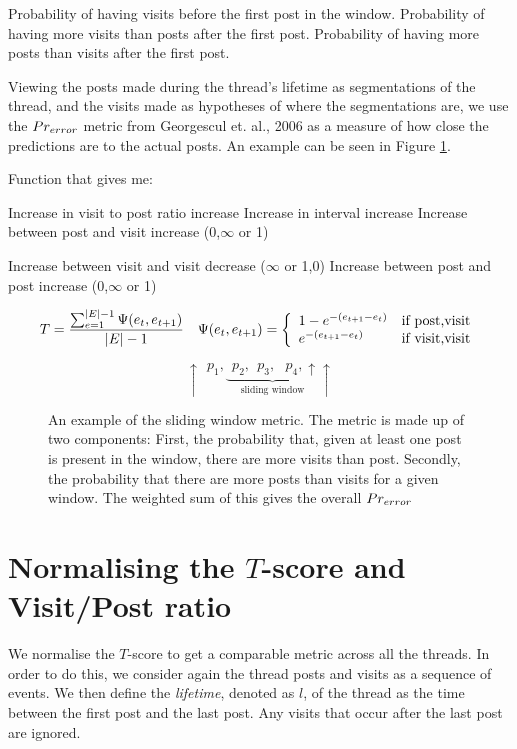 Probability of having visits before the first post in the window.
Probability of having more visits than posts after the first post.
Probability of having more posts than visits after the first post.



Viewing the posts made during the thread's lifetime as segmentations of the 
thread, and the visits made as hypotheses of where the segmentations are, we use 
the $Pr_{error}$ metric from Georgescul et. al., 2006 as a measure of how close 
the predictions are to the actual posts. An example can be seen in Figure 
\ref{prerror}.



Function that gives me:

Increase in visit to post ratio		increase
Increase in interval				increase
Increase between post and visit		increase
(0,$\infty$ or 1)

Increase between visit and visit	decrease
($\infty$ or 1,0)
Increase between post and post		increase
(0,$\infty$ or 1)

\[
	\begin{array}{l l}
	T = \dfrac{%
		\sum_{e=1}^{|E|-1} \Psi(e_t,e_{t+1}) %
	}{|E|-1} &
		\Psi(e_t,e_{t+1}) = \left\{\begin{array}{l l}
				1-e^{-(e_{t+1} - e_t)}	& \text{if post,visit}\\
				e^{-(e_{t+1} - e_t)}			& \text{if visit,visit}\\
		\end{array}\right.
\end{array}
\]

\begin{figure}
\[
	\uparrow~~p_1,\underbrace{~~p_2,~~p_3,~~~p_4,\uparrow}_{\text{sliding window}}\uparrow
\]
\caption{An example of the sliding window metric. The metric is made up of two components: First, the probability that, given at least one post is present in the window, there are more visits than post. Secondly, the probability that there are more posts than visits for a given window. The weighted sum of this gives the overall $Pr_{error}$}\label{prerror}
\end{figure}


\section{Normalising the $T$-score and Visit/Post ratio}
We normalise the $T$-score to get a comparable metric across all the threads. In 
order to do this, we consider again the thread posts and visits as a sequence of 
events. We then define the \emph{lifetime}, denoted as $l$, of the thread as the 
time between the first post and the last post. Any visits that occur after the 
last post are ignored.

